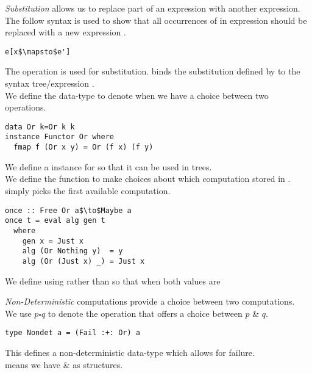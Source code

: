 \documentclass[11pt,a4paper]{article}
\begin{document}
\textit{Substitution} allows us to replace part of an expression with another expression.\\
The follow syntax is used to show that all occurrences of {} in expression {} should be replaced with a new expression {}.
\begin{lstlisting}
e[x$\mapsto$e']
\end{lstlisting}
The {\ttfamily{>>=}} operation is used for substitution. {} binds the substitution defined by {} to the syntax tree/expression {}.\\

We define the {} data-type to denote when we have a choice between two operations.\\
\begin{lstlisting}
data Or k=Or k k
instance Functor Or where
  fmap f (Or x y) = Or (f x) (f y)
\end{lstlisting}
\NB We define a {} instance for {} so that it can be used in {} trees.\\

We define the function {} to make choices about which computation stored in {}.\\
{} simply picks the first available computation.
\begin{lstlisting}
once :: Free Or a$\to$Maybe a
once t = eval alg gen t
  where
    gen x = Just x
    alg (Or Nothing y)  = y
    alg (Or (Just x) _) = Just x
\end{lstlisting}
\NB We define using {} rather than {} so that when both values are {}

\textit{Non-Deterministic} computations provide a choice between two computations.\\ 
We use $p\square q$ to denote the operation that offers a choice between $p$ \& $q$.
\begin{lstlisting}
type Nondet a = (Fail :+: Or) a
\end{lstlisting}
This defines a non-deterministic data-type which allows for failure.\\
 means we have {} \& {} as structures.\\
\end{document}

